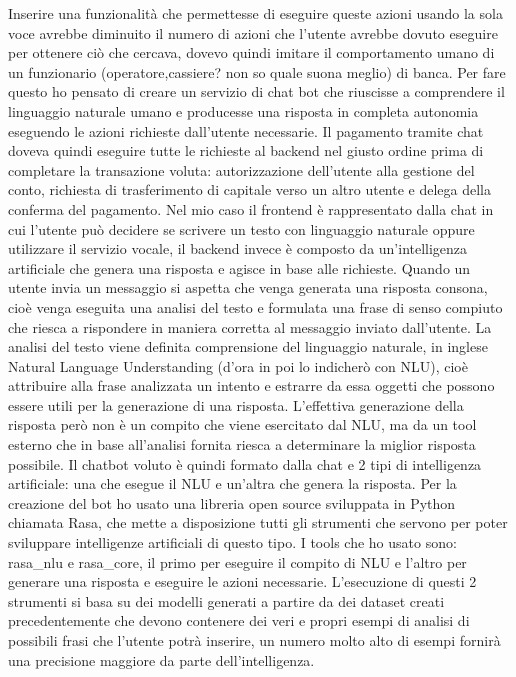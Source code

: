 Inserire una funzionalità che permettesse di eseguire queste azioni usando la sola voce avrebbe diminuito il numero di azioni che l'utente avrebbe dovuto eseguire per ottenere ciò che cercava, dovevo quindi imitare il comportamento umano di un funzionario (operatore,cassiere? non so quale suona meglio) di banca. Per fare questo ho pensato di creare un servizio di chat bot che riuscisse a comprendere il linguaggio naturale umano e producesse una risposta in completa autonomia eseguendo le azioni richieste dall'utente necessarie.
Il pagamento tramite chat doveva quindi eseguire tutte le richieste al backend nel giusto ordine prima di completare la transazione voluta: autorizzazione dell'utente alla gestione del conto, richiesta di trasferimento di capitale verso un altro utente e delega della conferma del pagamento.
Nel mio caso il frontend è rappresentato dalla chat in cui l'utente può decidere se scrivere un testo con linguaggio naturale oppure utilizzare il servizio vocale, il backend invece è composto da un'intelligenza artificiale che genera una risposta e agisce in base alle richieste.
Quando un utente invia un messaggio si aspetta che venga generata una risposta consona, cioè venga eseguita una analisi del testo e formulata una frase di senso compiuto che riesca a rispondere in maniera corretta al messaggio inviato dall'utente. La analisi del testo viene definita comprensione del linguaggio naturale, in inglese Natural Language Understanding (d'ora in poi lo indicherò con NLU), cioè attribuire alla frase analizzata un intento e estrarre da essa oggetti che possono essere utili per la generazione di una risposta. L'effettiva generazione della risposta però non è un compito che viene esercitato dal NLU, ma da un tool esterno che in base all'analisi fornita riesca a determinare la miglior risposta possibile.
Il chatbot voluto è quindi formato dalla chat e 2 tipi di intelligenza artificiale: una che esegue il NLU e un'altra che genera la risposta.
Per la creazione del bot ho usato una libreria open source sviluppata in Python chiamata Rasa, che mette a disposizione tutti gli strumenti che servono per poter sviluppare intelligenze artificiali di questo tipo. I tools che ho usato sono: rasa\_nlu e rasa\_core, il primo per eseguire il compito di NLU e l'altro per generare una risposta e eseguire le azioni necessarie.
L'esecuzione di questi 2 strumenti si basa su dei modelli generati a partire da dei dataset creati precedentemente che devono contenere dei veri e propri esempi di analisi di possibili frasi che l'utente potrà inserire, un numero molto alto di esempi fornirà una precisione maggiore da parte dell'intelligenza.
